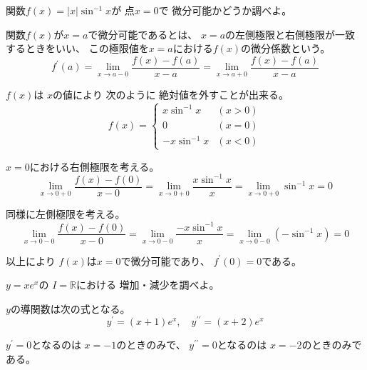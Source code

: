 \documentclass[12pt,b5paper]{ltjsarticle}
\begin{document}
\hrulefill

関数$f(x) = \lvert x \rvert \sin^{-1}{x}$が
点$x=0$で
微分可能かどうか調べよ。

\dotfill

関数$f(x)$が$x=a$で微分可能であるとは、
$x=a$の左側極限と右側極限が一致するときをいい、
この極限値を$x=a$における$f(x)$の微分係数という。
\begin{equation}
 f^{\prime}(a)
  =\lim _{x \rightarrow a-0} \frac{f(x)-f(a)}{x-a}
  =\lim _{x \rightarrow a+0} \frac{f(x)-f(a)}{x-a}
\end{equation}

\dotfill

$f(x)$は
$x$の値により
次のように
絶対値を外すことが出来る。
\begin{equation}
 f(x)=
  \begin{cases}
   x \sin^{-1}{x} & (x>0)\\
   0 & (x=0)\\
   -x \sin^{-1}{x} & (x<0)
  \end{cases}
\end{equation}

$x=0$における右側極限を考える。
\begin{equation}
 \lim _{x \rightarrow 0+0} \frac{f(x)-f(0)}{x-0}
  =\lim _{x \rightarrow 0+0} \frac{x\sin^{-1}{x}}{x}
  =\lim _{x \rightarrow 0+0} \sin^{-1}{x}
  =0
\end{equation}

同様に左側極限を考える。
\begin{equation}
 \lim _{x \rightarrow 0-0} \frac{f(x)-f(0)}{x-0}
  =\lim _{x \rightarrow 0-0} \frac{-x\sin^{-1}{x}}{x}
  =\lim _{x \rightarrow 0-0} \left( -\sin^{-1}{x} \right)
  =0
\end{equation}

以上により
$f(x)$は$x=0$で微分可能であり、
$f^{\prime}(0)=0$である。



\hrulefill

$y=x e^{x}$の
$I=\mathbb{R}$における
増加・減少を調べよ。

\dotfill

$y$の導関数は次の式となる。
\begin{equation}
 y^{\prime} = (x+1)e^{x}
  ,\quad
  y^{\prime\prime} = (x+2)e^{x}
\end{equation}

$y^{\prime}=0$となるのは
$x=-1$のときのみで、
$y^{\prime\prime}=0$となるのは
$x=-2$のときのみである。

\end{document}
